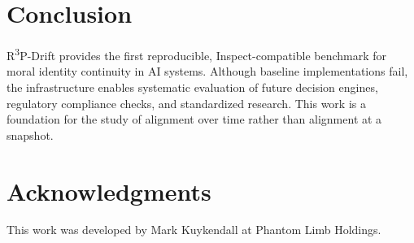 \documentclass{article}
\begin{document}
\section{Conclusion}
R\textsuperscript{3}P-Drift provides the first reproducible, Inspect-compatible benchmark for moral identity continuity in AI systems.
Although baseline implementations fail, the infrastructure enables systematic evaluation of future decision engines, regulatory compliance checks, and standardized research.
This work is a foundation for the study of alignment over time rather than alignment at a snapshot.

\section*{Acknowledgments}
This work was developed by Mark Kuykendall at Phantom Limb Holdings.
\end{document}
